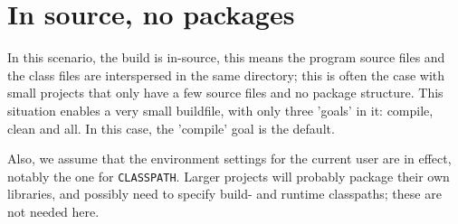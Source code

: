 \section{In source, no packages}
In this scenario, the build is in-source, this means the program
source files and the class files are interspersed in the same
directory; this is often the case with small projects that only have a
few source files and no package structure. This situation enables a
very small buildfile, with only three 'goals' in it: compile, clean
and all. In this case, the 'compile' goal is the default.

Also, we assume that the environment settings for the current user are
in effect, notably the one for \texttt{CLASSPATH}. Larger projects
will probably package their own libraries, and possibly need to
specify build- and runtime classpaths; these are not needed here.

